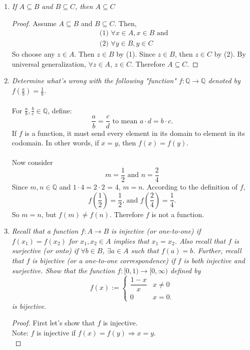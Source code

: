 \documentclass{amsart}
\begin{document}
\begin{enumerate}[1.]
\newpage

\item \emph{If $A\subseteq B$ and $B\subseteq C$, then $A\subseteq C$}
\begin{proof}
Assume $A\subseteq B$ and $B\subseteq C$. Then,
\begin{align*}
    &\text{(1) }\forall x\in A, x\in B \text{ and }\\
    &\text{(2) }\forall y\in B, y\in C
\end{align*}
So choose any $z\in A$. Then $z\in B$ by (1). Since $z\in B$, then
$z\in C$ by (2). By universal generalization, $\forall z\in A$,
$z\in C$. Therefore $A\subseteq C$.
\end{proof}

\newpage

\item \emph{Determine what's wrong with the following "function" 
$f:\mathbb{Q}\to \mathbb{Q}$ denoted by $f(\frac{a}{b})=\frac{1}{b}$.} \\\\
For $\frac{a}{b}, \frac{b}{c}\in \mathbb{Q}$, define:
\[
    \frac{a}{b} = \frac{c}{d} \text{ to mean } a\cdot d = b\cdot c.
\] 
If $f$ is a function, it must send every element in its domain to
 element in its codomain. In other words, if
$x=y$, then $f(x)=f(y)$.\\\\

Now consider
\[
    m = \frac{1}{2} \text{ and } n = \frac{2}{4}    
\]
Since $m, n\in\mathbb{Q}$ and $1\cdot 4 = 2\cdot 2$ = 4, $m=n$. According
to the definition of $f$,
\[
    f\left(\frac{1}{2}\right) = \frac{1}{2} \text{, and }
    f\left(\frac{2}{4}\right) = \frac{1}{4}.
\]
So $m = n$, but $f(m)\neq f(n)$. Therefore $f$ is not a function.

\newpage

\item \emph{Recall that a function $f:A\to B$ is \emph{injective} (or one-to-one) if $f(x_1)=f(x_2)$ for $x_1,x_2\in A$ implies that $x_1=x_2$.  Also recall that $f$ is \emph{surjective} (or onto) if $\forall b\in B$, $\exists a\in A$ such that $f(a)=b$.  Further, recall that $f$ is \emph{bijective} (or a one-to-one correspondence) if $f$ is both injective and surjective. Show that the function $f:[0,1)\to [0,\infty)$ defined by
\[ 	f(x):= \begin{cases} \dfrac{1-x}{x} &  x\neq 0 \\
		                 0 & x=0. \end{cases} \]
is bijective.
}
\begin{proof} First let's show that $f$ is injective. \\
Note: $f$ is injective if $f(x) = f(y) \Rightarrow x = y$.\\


\end{proof}
\end{enumerate}
\end{document}
